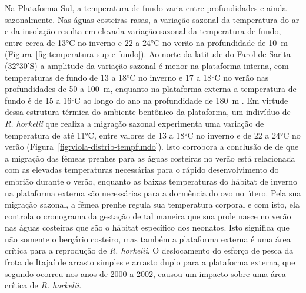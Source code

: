 \documentclass[a4paper,11pt,twoside,showtrims,onecolumn,openright,final]{memoir}
\begin{document}

Na Plataforma Sul, a temperatura de fundo varia entre profundidades 
e ainda sazonalmente. Nas águas costeiras rasas, a variação sazonal da temperatura do 
ar e da insolação resulta em elevada variação sazonal da temperatura de fundo, entre 
cerca de 13°C no inverno e 22 a 24°C no verão na profundidade de 10~m (Figura~\ref{fig:temperatura-sup-e-fundo}). %
Ao norte da latitude do Farol de Sarita (32°30'S) a amplitude da  variação sazonal 
é menor na plataforma interna, com temperaturas de fundo de 13 a 18°C no inverno 
e  17 a 18°C no verão nas profundidades de 50 a 100~m, enquanto na plataforma externa 
a temperatura de fundo é de 15 a 16°C ao longo do ano 
na profundidade de 180~m \citep{CASTELLO1977,castro1998}.
Em virtude dessa estrutura térmica do ambiente bentônico da plataforma, um indivíduo 
de \emph{R. horkelii} que realiza a migração sazonal experimenta uma variação 
de temperatura de até 11°C,  entre valores de 13 a 18°C no inverno e 
de 22 a 24°C no verão (Figura~\ref{fig:viola-distrib-tempfundo}). 
Isto corrobora a conclusão de \citet{lessa1986} %
de que a migração das fêmeas prenhes para as águas costeiras 
no verão está relacionada com as elevadas 
temperaturas necessárias para o rápido desenvolvimento do embrião durante o verão, 
enquanto as baixas temperaturas do hábitat de inverno na plataforma externa são 
necessárias para a dormência do ovo no útero. Pela sua migração sazonal, a fêmea 
prenhe regula sua temperatura corporal e com isto, ela controla o cronograma da 
gestação de tal maneira que sua prole nasce no verão nas águas costeiras que são 
o hábitat específico dos neonatos. Isto significa que não somente o berçário costeiro, 
mas também a plataforma externa é uma área crítica para a reprodução de \emph{R. horkelii}. 
O deslocamento do esforço de pesca da frota de Itajaí de arrasto simples e arrasto duplo 
para a plataforma externa, que segundo \citet{martins2003} %
ocorreu nos anos de 2000 a 2002, causou um impacto sobre 
uma área crítica de \emph{R. horkelii}.
\end{document}

